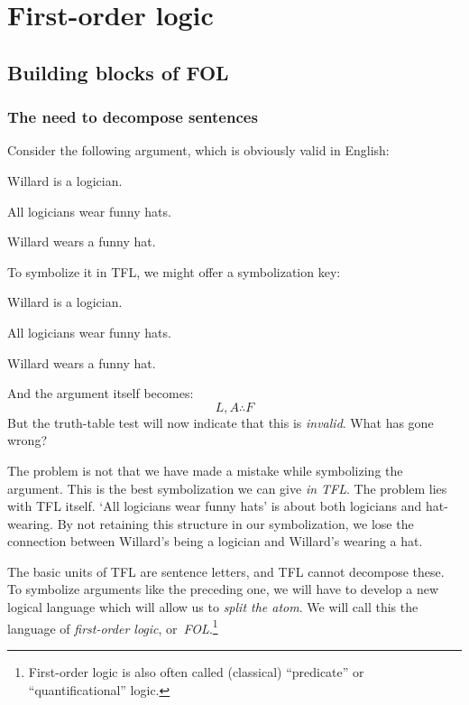 \part{First-order logic}
\label{ch.FOL}
\chapter{Building blocks of FOL}\label{s:FOLBuildingBlocks}

\section{The need to decompose sentences}
Consider the following argument, which is obviously valid in English:
\begin{earg}
\label{willard1}
\item[] Willard is a logician.
\item[] All logicians wear funny hats.
\item[\texttherefore] Willard wears a funny hat.
\end{earg}
To symbolize it in TFL, we might offer a symbolization key:
\begin{ekey}
\item[L] Willard is a logician.
\item[A] All logicians wear funny hats.
\item[F] Willard wears a funny hat.
\end{ekey}
And the argument itself becomes:
$$L, A \therefore F$$
But the truth-table test will now indicate that this is \emph{invalid}. What has gone wrong?

The problem is not that we have made a mistake while symbolizing the argument. This is the best symbolization we can give \emph{in TFL}. The problem lies with TFL itself. `All logicians wear funny hats' is about both logicians and hat-wearing. By not retaining this structure in our symbolization, we lose the connection between Willard's being a logician and Willard's wearing a hat.

The basic units of TFL are sentence letters, and TFL cannot decompose
these. To symbolize arguments like the preceding one, we will have to
develop a new logical language which will allow us to \emph{split the
atom}. We will call this the language of \emph{first-order logic},
or~\emph{FOL}.\footnote{First-order logic is also often called (classical)
``predicate'' or ``quantificational'' logic.}

